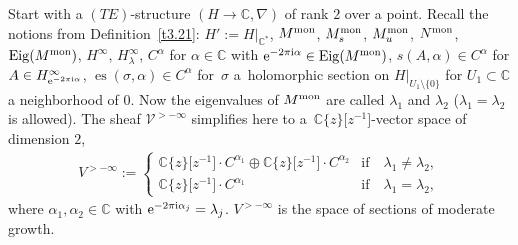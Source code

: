 \documentclass[pdftex]{sigma}%
\numberwithin{equation}{section}
\numberwithin{figure}{section}
\newcommand{\C}{{\mathbb C}}
\newcommand{\VV}{{\mathcal V}}
\newcommand{\nnn}{\nabla}
\DeclareMathOperator{\Eig}{Eig}
\begin{document}
\begin{Notation}\label{t4.16}
Start with a $(TE)$-structure $(H\to\C,\nnn)$ of rank $2$
over a point. Recall the notions from Definition~\ref{t3.21}:
$H':=H|_{\C^*}$, $M^{\rm mon}$, $M^{\rm mon}_s$, $M^{\rm mon}_u$, $N^{\rm mon}$,
$\Eig(M^{\rm mon})$, $H^\infty$, $H^\infty_{\lambda}$, $C^\alpha$
for $\alpha\in\C$ with ${\rm e}^{-2\pi {\rm i}\alpha}\in \Eig(M^{\rm mon})$,
$s(A,\alpha)\in C^\alpha$ for
$A\in H^{\infty}_{{\rm e}^{-2\pi {\rm i}\alpha}}$,
$\operatorname{es}(\sigma,\alpha)\in C^\alpha$ for~$\sigma$
a~holomorphic section on $H|_{U_1\setminus\{0\}}$ for
$U_1\subset\C$ a neighborhood of 0.
Now the eigenvalues of $M^{\rm mon}$ are called $\lambda_1$
and $\lambda_2$ ($\lambda_1=\lambda_2$ is allowed).
The sheaf $\VV^{>-\infty}$ simplifies here to a~$\C\{z\}\big[z^{-1}\big]$-vector space of dimension $2$,
\begin{gather*}%
V^{>-\infty}:= \begin{cases}
\C\{z\}\big[z^{-1}\big]\cdot C^{\alpha_1}
\oplus \C\{z\}\big[z^{-1}\big]\cdot C^{\alpha_2}&
\text{if}\quad\lambda_1\neq\lambda_2,
\\[1ex]
\C\{z\}\big[z^{-1}\big]\cdot C^{\alpha_1}&
\text{if}\quad\lambda_1=\lambda_2,\end{cases}
\end{gather*}
where $\alpha_1,\alpha_2\in\C$ with
${\rm e}^{-2\pi {\rm i}\alpha_j}=\lambda_j$.
$V^{>-\infty}$ is the space of sections of moderate growth.
\end{Notation}
\end{document}
